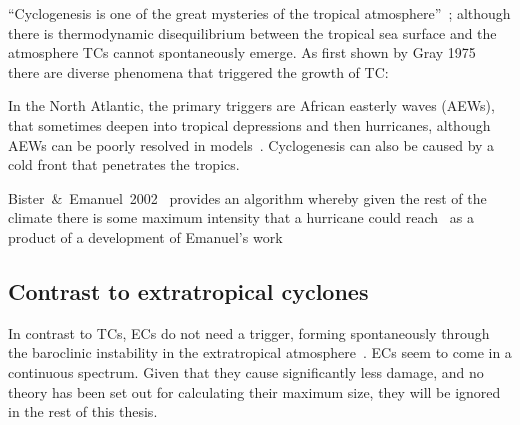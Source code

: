 
``Cyclogenesis is one of the great
 mysteries of the tropical atmosphere''~\cite{emanuel2018progress};
although there is thermodynamic disequilibrium between the tropical sea
surface and the atmosphere TCs cannot spontaneously emerge. As first shown by
Gray 1975~\cite{gray1975tropical} there are
 diverse phenomena that triggered the growth of TC:

 In the North Atlantic, the primary triggers are African easterly waves (AEWs),
 that sometimes deepen into tropical depressions and then hurricanes,
 although AEWs can be poorly resolved in models~\cite{tomassini2017interaction}.
 Cyclogenesis can also be caused by a cold front that penetrates the tropics.


Bister~\&~Emanuel~2002~\cite{bister2002low} provides an algorithm whereby given the rest of the climate
there is some maximum intensity that a hurricane could reach~\cite{bister2002low}
as a product of a development of Emanuel's work~\cite{bister1996development,
bister1998dissipative, bister2002low}


\subsection{Contrast to extratropical cyclones}
In contrast to TCs,  ECs do not need a trigger, forming
spontaneously through the baroclinic instability
in the extratropical atmosphere~\cite{lorenz1960energy}.
ECs seem to come in a continuous spectrum.
Given that they cause
significantly less damage, and no theory has been
 set out for calculating their maximum size,
they will be ignored in the rest of this thesis.
